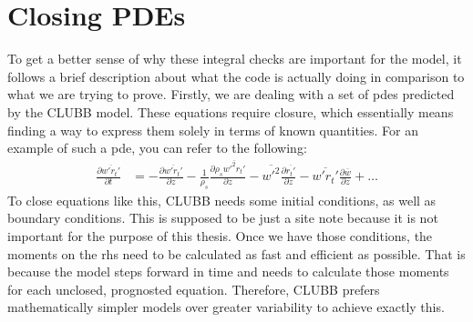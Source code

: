 \section{Closing PDEs}\label{sec:closing_pdes}

To get a better sense of why these integral checks are important for the model, it follows a brief description about what the code is actually doing in comparison to what we are trying to prove.
Firstly, we are dealing with a set of \glspl{pde} predicted by the \gls{CLUBB} model.
These equations require closure, which essentially means finding a way to express them solely in terms of known quantities.
For an example of such a \gls{pde}, you can refer to the following\cite[p. 21]{larson2022clubbsilhs}:
\begin{align*}
    \frac{\partial \overline{w'r_t'}}{\partial t}
    &= -\frac{\partial \overline{w'r_t'}}{\partial z}
    - \frac{1}{\rho_s} \frac{\partial \rho_s \overline{w'^2r_t'}}{\partial z}
    - \overline{w'^2} \frac{\partial \overline{r_t'}}{\partial z}
    - \overline{w'r_t'} \frac{\partial \overline{w}}{\partial z}
    + \ldots
\end{align*}
To close equations like this, \gls{CLUBB} needs some initial conditions, as well as boundary conditions.
This is supposed to be just a site note because it is not important for the purpose of this thesis.
Once we have those conditions, the moments on the \gls{rhs} need to be calculated as fast and efficient as possible.
That is because the model steps forward in time and needs to calculate those moments for each unclosed, prognosted equation.
Therefore, \gls{CLUBB} prefers mathematically simpler models over greater variability to achieve exactly this.